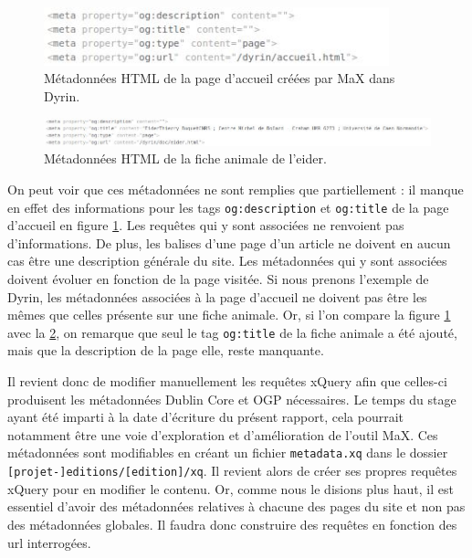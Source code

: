 \documentclass[a4paper,12pt,twoside]{book}
\begin{document}
\begin{figure}[H]
    \centering
    \includegraphics[width=10cm]{img/partie_2/og_test.JPG}
    \caption{Métadonnées \acrshort{HTML} de la page d'accueil créées par MaX dans Dyrin.}
    \label{meta_accueil}
\end{figure}


\begin{figure}[H]
    \centering
    \includegraphics[width=15cm]{img/partie_2/og_test_eider.JPG}
    \caption{Métadonnées \acrshort{HTML} de la fiche animale de l'eider.}
    \label{meta_eider}
\end{figure}


On peut voir que ces métadonnées ne sont remplies que partiellement : il manque en effet des informations pour les tags \texttt{og:description} et \texttt{og:title} de la page d'accueil en figure \ref{meta_accueil}. Les requêtes qui y sont associées ne renvoient pas d'informations. De plus, les balises d'une page d'un article ne doivent en aucun cas être une description générale du site. Les métadonnées qui y sont associées doivent évoluer en fonction de la page visitée. Si nous prenons l'exemple de Dyrin, les métadonnées associées à la page d'accueil ne doivent pas être les mêmes que celles présente sur une fiche animale. Or, si l'on compare la figure \ref{meta_accueil} avec la \ref{meta_eider}, on remarque que seul le tag \texttt{og:title} de la fiche animale a été ajouté, mais que la description de la page elle, reste manquante.


Il revient donc de modifier manuellement les requêtes xQuery afin que celles-ci produisent les métadonnées Dublin Core et OGP nécessaires. Le temps du stage ayant été imparti à la date d'écriture du présent rapport, cela pourrait notamment être une voie d'exploration et d'amélioration de l'outil MaX. Ces métadonnées sont modifiables en créant un fichier \texttt{metadata.xq} dans le dossier \texttt{[projet-]editions/[edition]/xq}. Il revient alors de créer ses propres requêtes xQuery pour en modifier le contenu. Or, comme nous le disions plus haut, il est essentiel d'avoir des métadonnées relatives à chacune des pages du site et non pas des métadonnées globales. Il faudra donc construire des requêtes en fonction des url interrogées. 
\end{document}

